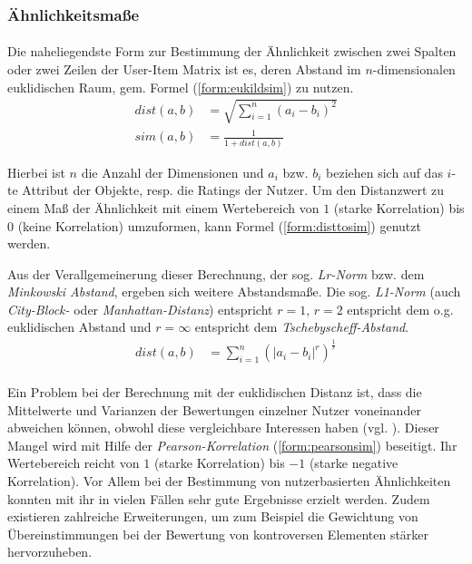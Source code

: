 \subsubsection{Ähnlichkeitsmaße}
\label{sec:similarities}

\paragraph{} Die naheliegendste Form zur Bestimmung der Ähnlichkeit zwischen zwei Spalten oder zwei Zeilen der User-Item Matrix ist es, deren Abstand im $n$-dimensionalen euklidischen Raum, gem. Formel (\ref{form:eukildsim}) zu nutzen.
\begin{align}
\label{form:eukildsim}
dist(a,b) & = \sqrt{\sum_{i=1}^{n} (a_i - b_i)^2} \\
sim(a,b) & = \frac{1}{1+dist(a,b)} \label{form:disttosim}
\end{align}

Hierbei ist $n$ die Anzahl der Dimensionen und $a_i$ bzw. $b_i$ beziehen sich auf das  $i$-te Attribut der Objekte, resp. die Ratings der Nutzer. Um den Distanzwert zu einem Maß der Ähnlichkeit mit einem Wertebereich von $1$ (starke Korrelation) bis $0$ (keine Korrelation) umzuformen, kann Formel (\ref{form:disttosim}) genutzt werden.

Aus der Verallgemeinerung dieser Berechnung, der sog. \textit{Lr-Norm} bzw. dem \textit{Minkowski Abstand}, ergeben sich weitere Abstandsmaße. Die sog. \textit{L1-Norm} (auch \textit{City-Block-} oder \textit{Manhattan-Distanz}) entspricht $r=1$, $r=2$ entspricht dem o.g. euklidischen Abstand und $ r=\infty $ entspricht dem \textit{Tschebyscheff-Abstand}. \citep{hb_02}
\begin{align}
\label{form:minkowskisim}
dist(a,b) & = \sum_{i=1}^{n} (\left| a_i - b_i \right|^r)^\frac{1}{r}
\end{align}

\paragraph{} Ein Problem bei der Berechnung mit der euklidischen Distanz ist, dass die Mittelwerte und Varianzen der Bewertungen einzelner Nutzer voneinander abweichen können, obwohl diese vergleichbare Interessen haben (vgl. \citep[Kap. 2]{pci}). Dieser Mangel wird mit Hilfe der \textit{Pearson-Korrelation} (\ref{form:pearsonsim}) beseitigt.  Ihr Wertebereich reicht von $1$ (starke Korrelation) bis $-1$ (starke negative Korrelation). Vor Allem bei der Bestimmung von nutzerbasierten Ähnlichkeiten konnten mit ihr in vielen Fällen sehr gute Ergebnisse erzielt werden. Zudem existieren zahlreiche Erweiterungen, um zum Beispiel die Gewichtung von Übereinstimmungen bei der Bewertung von kontroversen Elementen stärker hervorzuheben. \citep[Kap. 2.1]{rs} \citep{hb_02}

